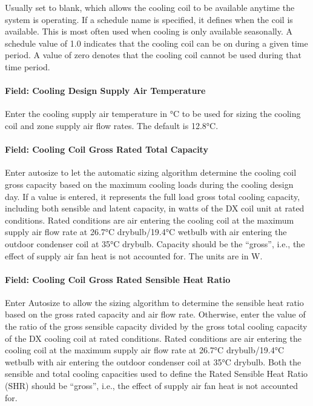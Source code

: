 Usually set to blank, which allows the cooling coil to be available anytime the system is operating. If a schedule name is specified, it defines when the coil is available. This is most often used when cooling is only available seasonally. A schedule value of 1.0 indicates that the cooling coil can be on during a given time period. A value of zero denotes that the cooling coil cannot be used during that time period.

\paragraph{Field: Cooling Design Supply Air Temperature}\label{field-cooling-design-supply-air-temperature}

Enter the cooling supply air temperature in °C to be used for sizing the cooling coil and zone supply air flow rates. The default is 12.8°C.

\paragraph{Field: Cooling Coil Gross Rated Total Capacity}\label{field-cooling-coil-gross-rated-total-capacity-4}

Enter autosize to let the automatic sizing algorithm determine the cooling coil gross capacity based on the maximum cooling loads during the cooling design day. If a value is entered, it represents the full load gross total cooling capacity, including both sensible and latent capacity, in watts of the DX coil unit at rated conditions. Rated conditions are air entering the cooling coil at the maximum supply air flow rate at 26.7°C drybulb/19.4°C wetbulb with air entering the outdoor condenser coil at 35°C drybulb. Capacity should be the ``gross'', i.e., the effect of supply air fan heat is not accounted for. The units are in W.

\paragraph{Field: Cooling Coil Gross Rated Sensible Heat Ratio}\label{field-cooling-coil-gross-rated-sensible-heat-ratio-4}

Enter Autosize to allow the sizing algorithm to determine the sensible heat ratio based on the gross rated capacity and air flow rate. Otherwise, enter the value of the ratio of the gross sensible capacity divided by the gross total cooling capacity of the DX cooling coil at rated conditions. Rated conditions are air entering the cooling coil at the maximum supply air flow rate at 26.7°C drybulb/19.4°C wetbulb with air entering the outdoor condenser coil at 35°C drybulb. Both the sensible and total cooling capacities used to define the Rated Sensible Heat Ratio (SHR) should be ``gross'', i.e., the effect of supply air fan heat is not accounted for.

